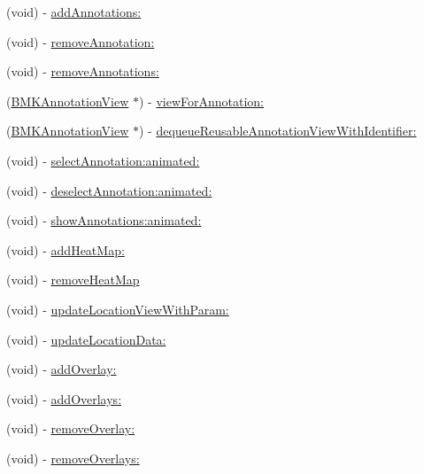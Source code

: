 \begin{DoxyCompactItemize}
(void) -\/ \hyperlink{interface_b_m_k_map_view_affd032313c55ae27814430b760e4aea0}{add\+Annotations\+:}
\item 
(void) -\/ \hyperlink{interface_b_m_k_map_view_a6b6b75a5bf8b02854767f782a38d2009}{remove\+Annotation\+:}
\item 
(void) -\/ \hyperlink{interface_b_m_k_map_view_a37fbe2b5db750affb4e0234cbf24a3c7}{remove\+Annotations\+:}
\item 
(\hyperlink{interface_b_m_k_annotation_view}{B\+M\+K\+Annotation\+View} $\ast$) -\/ \hyperlink{interface_b_m_k_map_view_a0fb885234188aef28df944d5f636c70c}{view\+For\+Annotation\+:}
\item 
(\hyperlink{interface_b_m_k_annotation_view}{B\+M\+K\+Annotation\+View} $\ast$) -\/ \hyperlink{interface_b_m_k_map_view_a4d4aa7a171876f3f66add8f86cca1e8c}{dequeue\+Reusable\+Annotation\+View\+With\+Identifier\+:}
\item 
(void) -\/ \hyperlink{interface_b_m_k_map_view_a92dbf00c3eff2ede4d4ffd485c4059e0}{select\+Annotation\+:animated\+:}
\item 
(void) -\/ \hyperlink{interface_b_m_k_map_view_a3d6bbc91bc3b66463ee97b3c909e4999}{deselect\+Annotation\+:animated\+:}
\item 
(void) -\/ \hyperlink{interface_b_m_k_map_view_a62093e51bd52b357d909b75b4447b415}{show\+Annotations\+:animated\+:}
\item 
(void) -\/ \hyperlink{interface_b_m_k_map_view_a5945dec15b2d38ecf4b8efd4ce6b49e2}{add\+Heat\+Map\+:}
\item 
(void) -\/ \hyperlink{interface_b_m_k_map_view_a1337cb03abdb9ae730a2410f0fbd2f2f}{remove\+Heat\+Map}
\item 
(void) -\/ \hyperlink{interface_b_m_k_map_view_afc9842b45a41341b3ea5d2e632344382}{update\+Location\+View\+With\+Param\+:}
\item 
(void) -\/ \hyperlink{interface_b_m_k_map_view_a72c1c3b690379ecf804cc20ddf5840e9}{update\+Location\+Data\+:}
\item 
(void) -\/ \hyperlink{interface_b_m_k_map_view_af85ad6091568df29d9e7c3dea82a1a2b}{add\+Overlay\+:}
\item 
(void) -\/ \hyperlink{interface_b_m_k_map_view_ab7d29d948515cc6d947d6aa63f904168}{add\+Overlays\+:}
\item 
(void) -\/ \hyperlink{interface_b_m_k_map_view_a3be1f2a019df3ff971f6a36f142e55be}{remove\+Overlay\+:}
\item 
(void) -\/ \hyperlink{interface_b_m_k_map_view_a3eb7909fb1adce117c1de432fd5d816a}{remove\+Overlays\+:}
\item 

\end{DoxyCompactItemize}
